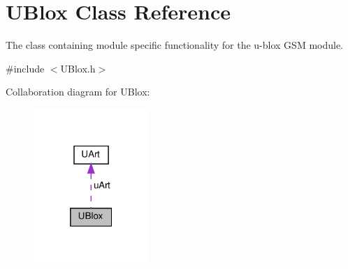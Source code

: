 \hypertarget{class_u_blox}{}\section{U\+Blox Class Reference}
\label{class_u_blox}


The class containing module specific functionality for the u-\/blox G\+SM module.  




{\ttfamily \#include $<$U\+Blox.\+h$>$}



Collaboration diagram for U\+Blox\+:
\nopagebreak
\begin{figure}[H]
\begin{center}
\leavevmode
\includegraphics[width=124pt]{d9/d30/class_u_blox__coll__graph}
\end{center}
\end{figure}
